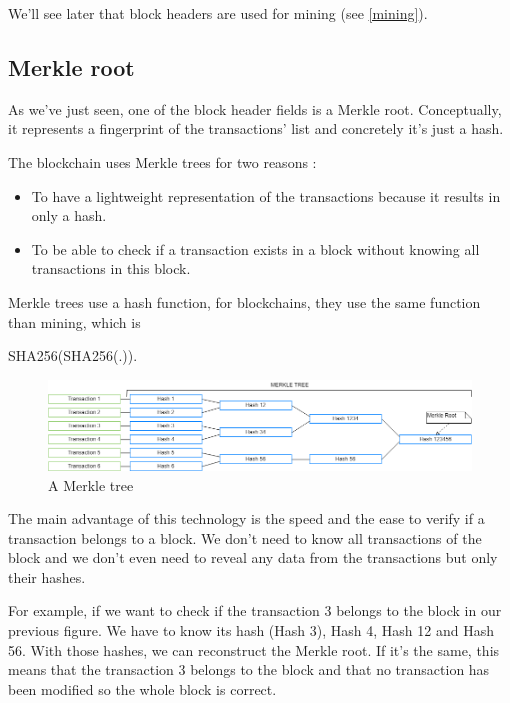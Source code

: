 We'll see later that block headers are used for mining (see \ref{mining}).


  \subsection{Merkle root} \label{merkleRoot}

  As we've just seen, one of the block header fields is a Merkle root. Conceptually, it represents a fingerprint of the transactions' list and concretely it's just a hash.

  The blockchain uses Merkle trees for two reasons :

  \begin{itemize}
    \item To have a lightweight representation of the transactions because it results in only a hash.
    \item To be able to check if a transaction exists in a block without knowing all transactions in this block.
  \end{itemize}

  Merkle trees use a hash function, for blockchains, they use the same function than mining, which is

  SHA256(SHA256(.)).

  \begin{figure}[ht]
  \centering
  \includegraphics[width=\textwidth]{Figures/merkleTree}
  \caption{A Merkle tree}
  \end{figure}
  \medskip

  The main advantage of this technology is the speed and the ease to verify if a transaction belongs to a block. We don't need to know all transactions of the block and we don't even need to reveal any data from the transactions but only their hashes. \newline

  For example, if we want to check if the transaction 3 belongs to the block in our previous figure. We have to know its hash (Hash 3), Hash 4, Hash 12 and Hash 56. With those hashes, we can reconstruct the Merkle root. If it's the same, this means that the transaction 3 belongs to the block and that no transaction has been modified so the whole block is correct.

